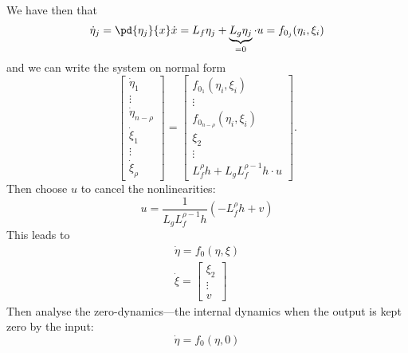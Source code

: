 We have then that
\begin{equation}
	\dot{\eta}_j = \pd{\eta_j}{x} \dot{x} = L_f \eta_j + \underbrace{L_g \eta_j}_{= 0} \cdot u = f_{0_j} (\eta_i, \xi_i)
\end{equation}
and we can write the system on normal form
\begin{equation}
	\begin{bmatrix}
		\dot{\eta}_1        \\
		\vdots              \\
		\dot{\eta}_{n-\rho} \\
		\dot{\xi}_1         \\
		\vdots              \\
		\dot{\xi}_\rho
	\end{bmatrix}
	=
	\begin{bmatrix}
		f_{0_1}(\eta_i, \xi_i)        \\
		\vdots                        \\
		f_{0_{n-\rho}}(\eta_i, \xi_i) \\
		\xi_2                         \\
		\vdots                        \\
		L_f^\rho h + L_g L_f^{\rho-1} h \cdot u
	\end{bmatrix}
	.
\end{equation}
Then choose $u$ to cancel the nonlinearities:
\begin{equation}
	u = \frac{1}{L_g L_f^{\rho-1} h} (-L_f^\rho h + v)
\end{equation}
This leads to
\begin{gather}
	\dot{\eta} = f_0(\eta,\xi) \\
	\dot{\xi} = 
	\begin{bmatrix}
		\xi_2 \\ \vdots \\ v
	\end{bmatrix}
\end{gather}
Then analyse the zero-dynamics---the internal dynamics when the output is kept zero by the input:
\begin{equation}
	\dot{\eta} = f_0(\eta,0)
\end{equation}